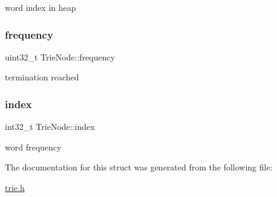 word index in heap \mbox{\label{structTrieNode_ac92c55f950af2435aa4d2db8eac59fee}} 
\subsubsection{\texorpdfstring{frequency}{frequency}}
{\footnotesize\ttfamily uint32\+\_\+t Trie\+Node\+::frequency}

termination reached \mbox{\label{structTrieNode_a565173828132dce7a69e1e94cf86dd2d}} 
\subsubsection{\texorpdfstring{index}{index}}
{\footnotesize\ttfamily int32\+\_\+t Trie\+Node\+::index}

word frequency 

The documentation for this struct was generated from the following file\+:\begin{DoxyCompactItemize}
\item 
\mbox{\hyperlink{trie_8h}{trie.\+h}}\end{DoxyCompactItemize}
